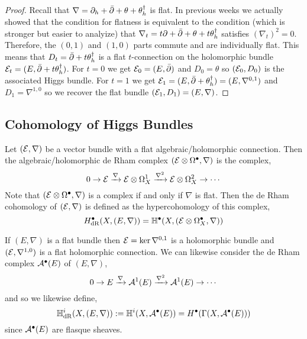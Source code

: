 \documentclass[12pt]{article}
\begin{document}
\begin{proof}
Recall that $\nabla = \partial_h + \bar{\partial} + \theta + \theta^\dagger_h$ is flat. In previous weeks we actually showed that the condition for flatness is equivalent to the condition (which is stronger but easier to analyize) that $\nabla_t = t \partial + \bar{\partial} + \theta + t \theta_h^\dagger$ satisfies $(\nabla_t)^2 = 0$. Therefore, the $(0,1)$ and $(1,0)$ parts commute and are individually flat. This means that $D_t = \bar{\partial} + t \theta^\dagger_h$ is a flat $t$-connection on the holomorphic bundle $\mathcal{E}_t = (E, \bar{\partial} + t \theta^\dagger_h)$. For $t = 0$ we get $\mathcal{E}_0 = (E, \bar{\partial})$ and $D_0 = \theta$ so $(\mathcal{E}_0, D_0)$ is the associated Higgs bundle. For $t = 1$ we get $\mathcal{E}_1 = (E, \bar{\partial} + \theta^\dagger_h) = (E, \nabla^{0,1})$ and $D_1 = \nabla^{1,0}$ so we recover the flat bundle $(\mathcal{E}_1, D_1) = (E, \nabla)$.
\end{proof}

\subsection{Cohomology of Higgs Bundles}

\newcommand{\HH}{\mathbb{H}}

\begin{defn}
Let $(\mathcal{E}, \nabla)$ be a vector bundle with a flat algebraic/holomorphic connection. Then the algebraic/holomorphic de Rham complex $(\mathcal{E} \otimes \Omega^\bullet, \nabla)$ is the complex,
\[ 0 \to \mathcal{E} \xrightarrow{\nabla} \mathcal{E} \otimes \Omega^1_X \xrightarrow{\nabla^2} \mathcal{E} \otimes \Omega^2_X \to \cdots \]
Note that $(\mathcal{E} \otimes \Omega^\bullet, \nabla)$ is a complex if and only if $\nabla$ is flat. Then the de Rham cohomology of $(\mathcal{E}, \nabla)$ is defined as the hypercohomology of this complex,
\[ H_{\dR}^\bullet(X, (E, \nabla)) = \HH^\bullet(X, (\E \ot \Omega_X^\bullet, \nabla)) \]
\end{defn}

\begin{rmk}
If $(E, \nabla)$ is a flat bundle then $\mathcal{E} = \ker{\nabla^{0,1}}$ is a holomorphic bundle and $(\mathcal{E}, \nabla^{1,0})$ is a flat holomorphic connection. We can likewise consider the de Rham complex $\mathcal{A}^\bullet(E)$ of $(E, \nabla)$,
\[ 0 \to E \xrightarrow{\nabla} \mathcal{A}^1(E) \xrightarrow{\nabla^2} \mathcal{A}^1(E) \to \cdots \]
and so we likewise define,
\[ \HH^i_{\dR}(X, (E, \nabla)) := \HH^i(X, \cA^\bullet(E)) = H^\bullet( \Gamma(X, \cA^\bullet(E))) \]
since $\mathcal{A}^\bullet(E)$ are flasque sheaves. 
\end{rmk}
\end{document}
